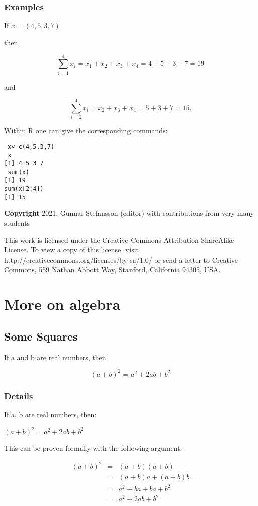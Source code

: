 \documentclass[12pt,a4paper]{article}
\theoremstyle{regla}
\theoremstyle{remark}
\theoremstyle{definition}
\theoremstyle{nonumberbreak}
\begin{document}
\subsubsection{Examples}
\begin{xmpl}
If $x=(4,5,3,7)$

then

$$\sum_{i=1}^{4} x_i = x_1+x_2+x_3+x_4 = 4+5+3+7 = 19
$$

and

$$
\sum_{i=2}^{4} x_i = x_2+x_3+x_4 = 5+3+7 = 15 .
$$

Within R one can give the corresponding commands:
\begin{lstlisting}
 x<-c(4,5,3,7)
 x
[1] 4 5 3 7
 sum(x)
[1] 19
sum(x[2:4])
[1] 15

\end{lstlisting}
\end{xmpl}

{\bf Copyright}
2021, Gunnar Stefansson (editor) with contributions from very many students

This work is licensed under the Creative Commons
Attribution-ShareAlike License. To view a copy of this license, visit
http://creativecommons.org/licenses/by-sa/1.0/ or send a letter to
Creative Commons, 559 Nathan Abbott Way, Stanford, California 94305,
USA.
\clearpage
\section{More on algebra}
\subsection{Some Squares}
\begin{fbox}
\begin{minipage}{0.97\textwidth}
If a and b are real numbers, then 

$$
(a+b)^2=a^2+2ab+b^2
$$
\end{minipage}
\end{fbox}
\subsubsection{Details}
If a, b are real numbers, then:

$(a+b)^2=a^2+2ab+b^2$

This can be proven formally with the following argument:

\begin{eqnarray*} 
(a+b)^2 &=& (a+b)(a+b)\\
       &=&( a+b)a+(a+b)b\\
       &=& a^2+ba+ba+b^2\\
       &=& a^2+2ab+b^2\\
\end{eqnarray*}
\end{document}
